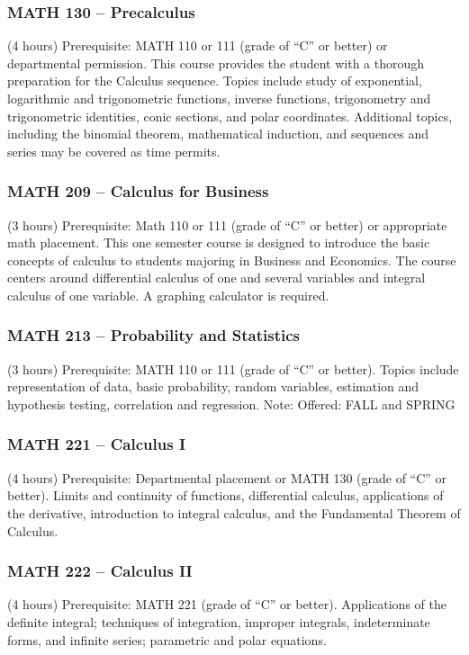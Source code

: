 \subsubsection{MATH 130 -- Precalculus}
(4 hours) Prerequisite: MATH 110 or 111 (grade of “C” or better) or departmental permission. This course provides the student with a thorough preparation for the Calculus sequence. Topics include study of exponential, logarithmic and trigonometric functions, inverse functions, trigonometry and trigonometric identities, conic sections, and polar coordinates. Additional topics, including the binomial theorem, mathematical induction, and sequences and series may be covered as time permits.

\subsubsection{MATH 209 -- Calculus for Business}
(3 hours) Prerequisite: Math 110 or 111 (grade of “C” or better) or appropriate math placement. This one semester course is designed to introduce the basic concepts of calculus to students majoring in Business and Economics. The course centers around differential calculus of one and several variables and integral calculus of one variable. A graphing calculator is required.

\subsubsection{MATH 213 -- Probability and Statistics}
(3 hours) Prerequisite: MATH 110 or 111 (grade of “C” or better). Topics include representation of data, basic probability, random variables, estimation and hypothesis testing, correlation and regression. Note: Offered: FALL and SPRING

\subsubsection{MATH 221 -- Calculus I}
(4 hours) Prerequisite: Departmental placement or MATH 130 (grade of “C” or better). Limits and continuity of functions, differential calculus, applications of the derivative, introduction to integral calculus, and the Fundamental Theorem of Calculus.

\subsubsection{MATH 222 -- Calculus II}
(4 hours) Prerequisite: MATH 221 (grade of “C” or better). Applications of the definite integral; techniques of integration, improper integrals, indeterminate forms, and infinite series; parametric and polar equations.

